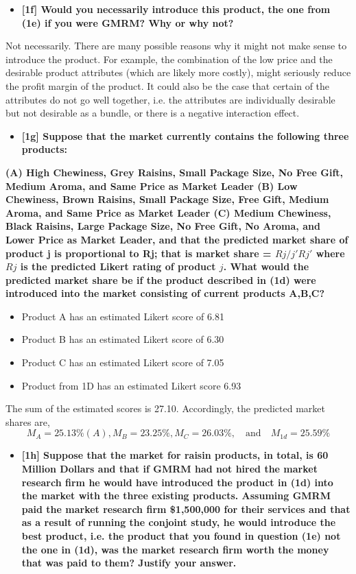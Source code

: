 \documentclass[10pt, oneside,spanish]{article}
\begin{document}
\begin{itemize}
\item \textbf{[1f] Would you necessarily introduce this product, the one from (1e) if you were GMRM?  Why or why not?}
\end{itemize}

Not necessarily. There are many possible reasons why it might not make sense to introduce the product. For example, the combination of the low price and the desirable product attributes (which are likely more costly), might seriously reduce the profit margin of the product. It could also be the case that certain of the attributes do not go well together, i.e. the attributes are individually desirable but not desirable as a bundle, or there is a negative interaction effect. 

\begin{itemize}
\item \textbf{[1g] Suppose that the market currently contains the following three products:}
\end{itemize}

\textbf{(A)	High Chewiness, Grey Raisins, Small Package Size, No Free Gift, Medium Aroma, and Same Price as Market Leader
(B)	Low Chewiness, Brown Raisins, Small Package Size, Free Gift, Medium Aroma, and Same Price as Market Leader
(C)	Medium Chewiness, Black Raisins, Large Package Size, No Free Gift, No Aroma, and Lower Price as Market Leader, and that the predicted market share of product j is proportional to Rj; that is market share = $Rj/j'Rj'$ where $Rj$ is the predicted Likert rating of product $j$.  What would the predicted market share be if the product described in (1d) were introduced into the market consisting of current products A,B,C?} 

\begin{itemize}
\item Product A has an estimated Likert score of 6.81
\item Product B has an estimated Likert score of 6.30
\item Product C has an estimated Likert score of 7.05
\item Product from 1D has an estimated Likert score 6.93
\end{itemize}

The sum of the estimated scores is 27.10. Accordingly, the predicted market shares are, $$M_A = 25.13\% (A) , M_B = 23.25\% , M_C = 26.03\% , \quad \textrm{and} \quad M_{1d} = 25.59\% $$


\begin{itemize}

\item \textbf{[1h]  Suppose that the market for raisin products, in total, is 60 Million Dollars and that if GMRM had not hired the market research firm he would have introduced the product in (1d) into the market with the three existing products. Assuming GMRM paid the market research firm \$1,500,000 for their services and that as a result of running the conjoint study, he would introduce the best product, i.e. the product that you found in question (1e) not the one in (1d), was the market research firm worth the money that was paid to them?  Justify your answer.   }
\end{itemize}
\end{document}
